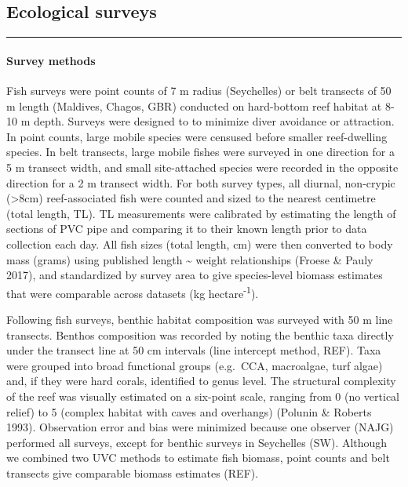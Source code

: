 \documentclass[]{article}
\title{}
\author{}
\date{}
\let\oldparagraph\paragraph
\renewcommand{\paragraph}[1]{\oldparagraph{#1}\mbox{}}
\begin{document}
\hypertarget{ecological-surveys}{%
\subsection{Ecological surveys}\label{ecological-surveys}}

\begin{center}\rule{0.5\linewidth}{\linethickness}\end{center}

\hypertarget{survey-methods}{%
\paragraph{Survey methods}\label{survey-methods}}

Fish surveys were point counts of 7 m radius (Seychelles) or belt
transects of 50 m length (Maldives, Chagos, GBR) conducted on
hard-bottom reef habitat at 8-10 m depth. Surveys were designed to to
minimize diver avoidance or attraction. In point counts, large mobile
species were censused before smaller reef-dwelling species. In belt
transects, large mobile fishes were surveyed in one direction for a 5 m
transect width, and small site-attached species were recorded in the
opposite direction for a 2 m transect width. For both survey types, all
diurnal, non-crypic (\textgreater{}8cm) reef-associated fish were
counted and sized to the nearest centimetre (total length, TL). TL
measurements were calibrated by estimating the length of sections of PVC
pipe and comparing it to their known length prior to data collection
each day. All fish sizes (total length, cm) were then converted to body
mass (grams) using published length \textasciitilde{} weight
relationships (Froese \& Pauly 2017), and standardized by survey area to
give species-level biomass estimates that were comparable across
datasets (kg hectare\textsuperscript{-1}).

Following fish surveys, benthic habitat composition was surveyed with 50
m line transects. Benthos composition was recorded by noting the benthic
taxa directly under the transect line at 50 cm intervals (line intercept
method, REF). Taxa were grouped into broad functional groups (e.g.~CCA,
macroalgae, turf algae) and, if they were hard corals, identified to
genus level. The structural complexity of the reef was visually
estimated on a six-point scale, ranging from 0 (no vertical relief) to 5
(complex habitat with caves and overhangs) (Polunin \& Roberts 1993).
Observation error and bias were minimized because one observer (NAJG)
performed all surveys, except for benthic surveys in Seychelles (SW).
Although we combined two UVC methods to estimate fish biomass, point
counts and belt transects give comparable biomass estimates (REF).
\end{document}
